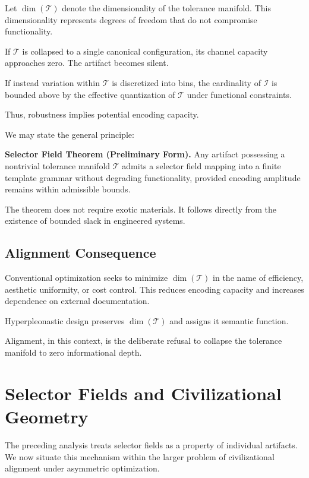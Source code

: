 \documentclass[11pt]{article}
\begin{document}
Let $\dim(\mathcal{T})$ denote the dimensionality of the tolerance 
manifold. This dimensionality represents degrees of freedom that do 
not compromise functionality.

If $\mathcal{T}$ is collapsed to a single canonical configuration, 
its channel capacity approaches zero. The artifact becomes silent.

If instead variation within $\mathcal{T}$ is discretized into bins, 
the cardinality of $\mathcal{I}$ is bounded above by the effective 
quantization of $\mathcal{T}$ under functional constraints.

Thus, robustness implies potential encoding capacity.

We may state the general principle:

\medskip

\noindent
\textbf{Selector Field Theorem (Preliminary Form).}
Any artifact possessing a nontrivial tolerance manifold 
$\mathcal{T}$ admits a selector field mapping into a finite template 
grammar without degrading functionality, provided encoding amplitude 
remains within admissible bounds.

\medskip

The theorem does not require exotic materials. It follows directly 
from the existence of bounded slack in engineered systems.

\subsection{Alignment Consequence}

Conventional optimization seeks to minimize $\dim(\mathcal{T})$ in the 
name of efficiency, aesthetic uniformity, or cost control. This reduces 
encoding capacity and increases dependence on external documentation.

Hyperpleonastic design preserves $\dim(\mathcal{T})$ and assigns it 
semantic function.

Alignment, in this context, is the deliberate refusal to collapse 
the tolerance manifold to zero informational depth.

\section{Selector Fields and Civilizational Geometry}

The preceding analysis treats selector fields as a property of individual 
artifacts. We now situate this mechanism within the larger problem of 
civilizational alignment under asymmetric optimization.
\end{document}
